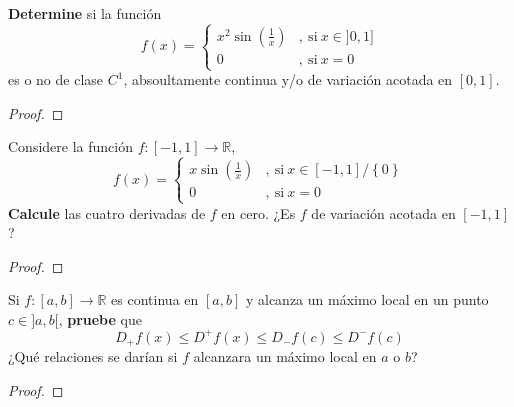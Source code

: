 \documentclass[12pt]{report}
\theoremstyle{largebreak}
\newcommand\cf[3]{\ensuremath{#1:#2\rightarrow#3}}
\begin{document}
    \begin{excer}
        \textbf{Determine} si la función
        \begin{equation*}
            f(x) = 
                \left \{
                    \begin{aligned}
                    x^2\sin\left(\frac{1}{x}\right) &,\ \text{si} \ x \in ]0,1] \\
                    0 &,\ \text{si} \ x=0
                    \end{aligned}
                \right .
        \end{equation*}
        es o no de clase $C^1$, absoultamente continua y/o de variación acotada en $[0,1]$.
    \end{excer}
    \begin{proof}
        
    \end{proof}

    \begin{excer}
        Considere la función $\cf{f}{[-1,1]}{\mathbb{R}}$,
        \begin{equation*}
            f(x) = 
                \left \{
                    \begin{aligned}
                    x\sin\left(\frac{1}{x}\right) &,\ \text{si} \ x \in [-1,1]/\left\{0\right\} \\
                    0 &,\ \text{si} \ x=0
                    \end{aligned}
                \right .
        \end{equation*}
        \textbf{Calcule} las cuatro derivadas de $f$ en cero. ¿Es $f$ de variación acotada en $[-1,1]$?
    \end{excer}

    \begin{proof}
        
    \end{proof}

    \begin{excer}
        Si $\cf{f}{[a,b]}{\mathbb{R}}$ es continua en $[a,b]$ y alcanza un máximo local en un punto $c\in]a,b[$, \textbf{pruebe} que
        \begin{equation*}
            D_+f(x)\leq D^+f(x)\leq D_-f(c)\leq D^-f(c)
        \end{equation*}
        ¿Qué relaciones se darían si $f$ alcanzara un máximo local en $a$ o $b$?
    \end{excer}
    
    \begin{proof}
        
    \end{proof}
\end{document}
